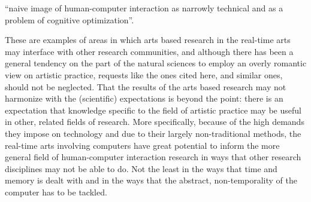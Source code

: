 ``naive image of human-computer interaction as narrowly technical and as a problem of cognitive optimization''. \citep[325]{engestrom96} 

These are examples of areas in which arts based research in the real-time arts may interface with other research communities, and although there has been a general tendency on the part of the natural sciences to employ an overly romantic view on artistic practice, requests like the ones cited here, and similar ones, should not be neglected. That the results of the arts based research may not harmonize with the (scientific) expectations is beyond the point: there is an expectation that knowledge specific to the field of artistic practice may be useful in other, related fields of research. More specifically, because of the high demands they impose on technology and due to their largely non-traditional methods, the real-time arts involving computers have great potential to inform the  more general field of human-computer interaction research in ways that other research disciplines may not be able to do. Not the least in the ways that time and memory is dealt with and in the ways that the abstract, non-temporality of the computer has to be tackled. 









